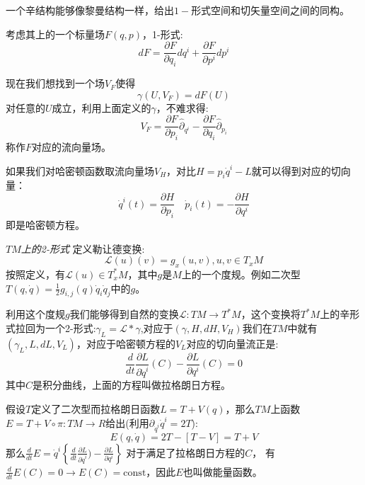 \documentclass[supercite]{HustGraduPaper}
\begin{document}
  一个辛结构能够像黎曼结构一样，给出$1-$形式空间和切矢量空间之间的同构。
  
  考虑其上的一个标量场$F(q,p)$，1-形式:
  \begin{equation}
  dF = \frac{\partial F}{\partial q_i}dq^i + \frac{\partial F}{\partial p^i} dp^i
  \end{equation}
    
    现在我们想找到一个场$V_F$使得
    \begin{equation}
    \gamma(U,V_F) = dF(U)
    \end{equation}
    对任意的$U$成立，利用上面定义的$\gamma$，不难求得:
    \begin{equation}
    V_F = \frac{\partial F}{\partial p_i} \hat{\partial}_{q^i} - \frac{\partial F}{\partial q_i} \hat{\partial}_{p_i}
      \end{equation}
      称作$F$对应的流向量场。
      
    如果我们对哈密顿函数取流向量场$V_H$，对比$H = p_i \dot{q}^i - L$就可以得到对应的切向量：
    \begin{equation}
    \dot{q}^i(t) = \frac{\partial H}{\partial p_i} \quad \dot{p}_i(t) = -\frac{\partial H}{\partial q^i}
    \end{equation}
    即是哈密顿方程。

    
    \textit{$TM$上的2-形式} 定义勒让德变换:
    \begin{equation}
    \mathcal{L}(u)(v) = g_x(u,v), u,v \in T_x M
    \end{equation}
    按照定义，有$\mathcal{L}(u) \in T_x^*M$，其中$g$是$M$上的一个度规。例如二次型$T(q,\dot{q}) = \frac{1}{2}g_{i,j}(q)\dot{q}_i \dot{q}_j$中的$g$。
    
    利用这个度规$g$我们能够得到自然的变换$\mathcal{L}: TM \to T^*M$，这个变换将$T^*M$上的辛形式拉回为一个2-形式:$\gamma_L = \mathcal{L} *\gamma$,对应于$(\gamma,H,dH,V_H)$我们在$TM$中就有$(\gamma_L,L,dL,V_L)$，对应于哈密顿方程的$V_L$对应的切向量流正是:
    \begin{equation}
    \frac{d}{dt}\frac{\partial L}{\partial \dot{q}^i} (C) - \frac{\partial L}{\partial q^i}(C) = 0
    \end{equation}
    其中$C$是积分曲线，上面的方程叫做拉格朗日方程。
    
    假设$T$定义了二次型而拉格朗日函数$L = T + V(q)$，那么$TM$上函数$E = T+ V\circ \pi: TM \to R$给出(利用$\partial_{\dot{q}^i}\dot{q}^i = 2T$):
    \begin{equation}
    E(q,\dot{q} ) =2T-[T-V] = T+V
    \end{equation}
    那么$\frac{d}{dt}E = \dot{q}^i \left\{  \frac{d}{dt}\frac{\partial L}{\partial \dot{q}^i})- \frac{\partial L}{\partial q^i}\right\}$
    对于满足了拉格朗日方程的$C$， 有$\frac{d}{dt}E(C) = 0 \to E(C) = \text{const}$，因此$E$也叫做能量函数。
    
\end{document}
